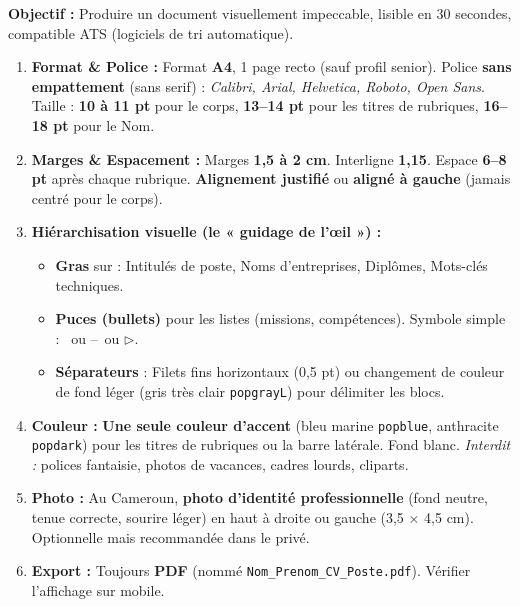 \documentclass[11pt]{article}
\begin{document}
\begin{methode}
    \textbf{Objectif :} Produire un document visuellement impeccable, lisible en 30 secondes, compatible ATS (logiciels de tri automatique).
    \begin{enumerate}
        \item \textbf{Format \& Police :} Format \textbf{A4}, 1 page recto (sauf profil senior). Police \textbf{sans empattement} (sans serif) : \emph{Calibri, Arial, Helvetica, Roboto, Open Sans}. Taille : \textbf{10 à 11 pt} pour le corps, \textbf{13--14 pt} pour les titres de rubriques, \textbf{16--18 pt} pour le Nom.
        \item \textbf{Marges \& Espacement :} Marges \textbf{1,5 à 2 cm}. Interligne \textbf{1,15}. Espace \textbf{6--8 pt} après chaque rubrique. \textbf{Alignement justifié} ou \textbf{aligné à gauche} (jamais centré pour le corps).
        \item \textbf{Hiérarchisation visuelle (le « guidage de l'œil ») :}
              \begin{itemize}
                  \item \textbf{Gras} sur : Intitulés de poste, Noms d'entreprises, Diplômes, Mots-clés techniques.
                  \item \textbf{Puces (bullets)} pour les listes (missions, compétences). Symbole simple : \textbullet\ ou --\ ou $\triangleright$.
                  \item \textbf{Séparateurs} : Filets fins horizontaux (0,5 pt) ou changement de couleur de fond léger (gris très clair \texttt{popgrayL}) pour délimiter les blocs.
              \end{itemize}
        \item \textbf{Couleur :} \textbf{Une seule couleur d'accent} (bleu marine \texttt{popblue}, anthracite \texttt{popdark}) pour les titres de rubriques ou la barre latérale. Fond blanc. \textit{Interdit :} polices fantaisie, photos de vacances, cadres lourds, cliparts.
        \item \textbf{Photo :} Au Cameroun, \textbf{photo d'identité professionnelle} (fond neutre, tenue correcte, sourire léger) en haut à droite ou gauche (3,5 $\times$ 4,5 cm). Optionnelle mais recommandée dans le privé.
        \item \textbf{Export :} Toujours \textbf{PDF} (nommé \texttt{Nom\_Prenom\_CV\_Poste.pdf}). Vérifier l'affichage sur mobile.
    \end{enumerate}
\end{methode}
\end{document}
